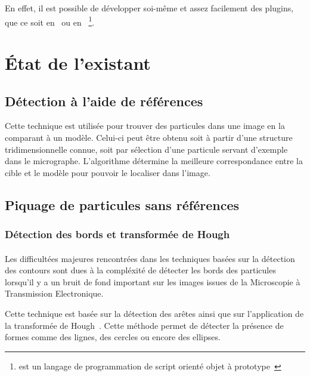 \documentclass[11pt,a4paper]{report}
\begin{document}
\noindent
En effet, il est possible de développer soi-même et assez facilement des plugins, que ce soit en \java\ ou en \js ~\footnote{\js est un langage de programmation de script orienté objet à prototype~\cite{javascript:url}}.
\section{\'Etat de l'existant}
\subsection{Détection à l'aide de références}
Cette technique est utilisée pour trouver des particules dans une image en la comparant à un modèle. Celui-ci peut \^etre obtenu soit à partir d'une structure tridimensionnelle connue, soit par sélection d'une particule servant d'exemple dans le micrographe. L'algorithme détermine la meilleure correspondance entre la cible et le modèle pour pouvoir le localiser dans l'image.%

\subsection{Piquage de particules sans références}
\subsubsection{Détection des bords et transformée de Hough}


\paragraph*{}
Les difficultées majeures rencontrées dans les techniques basées sur la détection des contours sont dues à la compléxité de détecter les bords des particules lorsqu'il y a un bruit de fond important sur les images issues de la Microscopie à Transmission Electronique.%

\noindent
Cette technique est basée sur la détection des arêtes ainsi que sur l'application de la transformée de Hough~\cite{PdetectEHT:article}. Cette méthode permet de détecter la présence de formes comme des lignes, des cercles ou encore des ellipses.%
\end{document}

